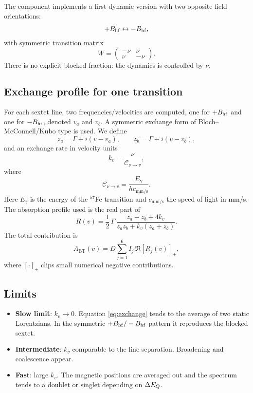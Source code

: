 The  component implements a first dynamic version with two opposite
field orientations:
\begin{equation}
  +B_{\mathrm{hf}} \leftrightarrow -B_{\mathrm{hf}},
\end{equation}
with symmetric transition matrix
\begin{equation}
  W=\begin{pmatrix}-\nu & \nu\\ \nu & -\nu\end{pmatrix}.
\end{equation}
There is no explicit blocked fraction: the dynamics is controlled by $\nu$.

\subsection{Exchange profile for one transition}

For each sextet line, two frequencies/velocities are computed, one for $+B_{\mathrm{hf}}$ and
one for $-B_{\mathrm{hf}}$, denoted $v_a$ and $v_b$. A symmetric exchange form of
Bloch--McConnell/Kubo type is used. We define
\begin{equation}
  z_a = \Gamma + i(v-v_a),\qquad z_b = \Gamma + i(v-v_b),
\end{equation}
and an exchange rate in velocity units
\begin{equation}
  k_v = \frac{\nu}{\mathcal{C}_{\nu\to v}},
\end{equation}
where
\begin{equation}
  \mathcal{C}_{\nu\to v}=\frac{E_\gamma}{h c_{\mathrm{mm/s}}}.
\end{equation}
Here $E_\gamma$ is the energy of the $^{57}$Fe transition and $c_{\mathrm{mm/s}}$
the speed of light in mm/s. The absorption profile used is the real part of
\begin{equation}
  R(v)=\frac{1}{2}\,\Gamma\,
  \frac{z_a+z_b+4k_v}{z_a z_b+k_v(z_a+z_b)}.
  \label{eq:exchange}
\end{equation}
The total contribution is
\begin{equation}
  A_{\mathrm{BT}}(v)=D\sum_{j=1}^{6} I_j\,\Re\left[R_j(v)\right]_+,
\end{equation}
where $[\cdot]_+$ clips small numerical negative contributions.

\subsection{Limits}

\begin{itemize}[leftmargin=*]
  \item \textbf{Slow limit}: $k_v\to0$. Equation \eqref{eq:exchange} tends to the
  average of two static Lorentzians. In the symmetric $+B_{\mathrm{hf}}/-B_{\mathrm{hf}}$ pattern it
  reproduces the blocked sextet.
  \item \textbf{Intermediate}: $k_v$ comparable to the line separation. Broadening
  and coalescence appear.
  \item \textbf{Fast}: large $k_v$. The magnetic positions are averaged out and the
  spectrum tends to a doublet or singlet depending on $\Delta E_{Q}$.
\end{itemize}

